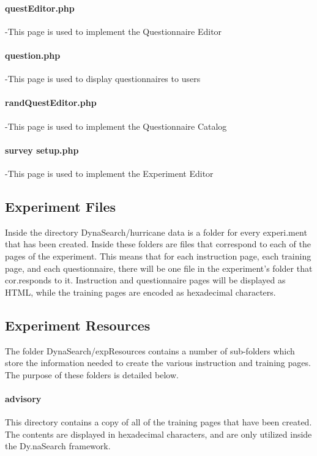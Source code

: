 \documentclass[article]{ij4uq}              %
\begin{document}
\paragraph{questEditor.php} -This page is used to implement the Questionnaire Editor 

\paragraph{question.php} -This page is used to display questionnaires to users 

\paragraph{randQuestEditor.php} -This page is used to implement the Questionnaire Catalog 

\paragraph{survey setup.php} -This page is used to implement the Experiment Editor

\subsection{Experiment Files}
Inside the directory DynaSearch/hurricane data is a folder for every experi.ment that has been created. Inside these folders are files that correspond to each of the pages of the experiment. This means that for each instruction page, each training page, and each questionnaire, there will be one file in the experiment's folder that cor.responds to it. Instruction and questionnaire pages will be displayed as HTML, while the training pages are encoded as hexadecimal characters.

\subsection{Experiment Resources}
The folder DynaSearch/expResources contains a number of sub-folders which store the information needed to create the various instruction and training pages. The purpose of these folders is detailed below.

\paragraph{advisory}
This directory contains a copy of all of the training pages that have been created. The contents are displayed in hexadecimal characters, and are only utilized inside the Dy.naSearch framework.
\end{document}
